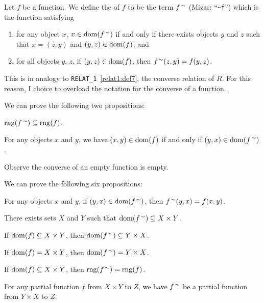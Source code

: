 \documentclass{article}
\begin{document}
\begin{definition}
Let $f$ be a function.
We define the  of $f$ to be the term
$f^{\,\sim}$ (Mizar: ``\verb#~f#'') which is the function
satisfying
\begin{defn}
\item \begin{enumerate}[label=(\roman*)]
\item for any object $x$, $x\in\operatorname{dom}(f^{\,\sim})$ if and only if there
  exists objects $y$ and $z$ such that $x=(z,y)$ and $(y,z)\in\operatorname{dom}(f)$; and
\item for all objects $y$, $z$, if $(y,z)\in\operatorname{dom}(f)$, then $f^{\,\sim}(z,y)=f(y,z)$.
\end{enumerate}
\end{defn}
\end{definition}

\begin{remark}
This is in analogy to \verb#RELAT_1#~\ref{relat1:def7}, the converse
relation of $R$. For this reason, I choice to overload the notation for
the converse of a function.
\end{remark}

We can prove the following two propositions:
\begin{thm}
\item\label{funct4:41} $\operatorname{rng}(f^{\,\sim})\subseteq\operatorname{rng}(f)$.
\item\label{funct4:42} For any objects $x$ and $y$, we have
  $(x,y)\in\operatorname{dom}(f)$ if and only if $(y,x)\in\operatorname{dom}(f^{\,\sim})$.
\end{thm}

Observe the converse of an empty function is empty.

We can prove the following six propositions:
\begin{thm}
\item\label{funct4:43} For any objects $x$ and $y$,
  if $(y,x)\in\operatorname{dom}(f^{\,\sim})$, then $f^{\,\sim}(y,x)=f(x,y)$.
\item\label{funct4:44} There exists sets $X$ and $Y$ such that
  $\operatorname{dom}(f^{\,\sim})\subseteq X\times Y$.
\item\label{funct4:45} If $\operatorname{dom}(f)\subseteq X\times Y$,
  then $\operatorname{dom}(f^{\,\sim})\subseteq Y\times X$.
\item\label{funct4:46} If $\operatorname{dom}(f)=X\times Y$,
  then $\operatorname{dom}(f^{\,\sim})=Y\times X$.
\item\label{funct4:47} If $\operatorname{dom}(f)\subseteq X\times Y$,
  then $\operatorname{rng}(f^{\,\sim})=\operatorname{rng}(f)$.
\item\label{funct4:48} For any partial function $f$ from $X\times Y$ to $Z$,
  we have $f^{\,\sim}$ be a partial function from $Y\times X$ to $Z$.
\end{thm}
\end{document}
